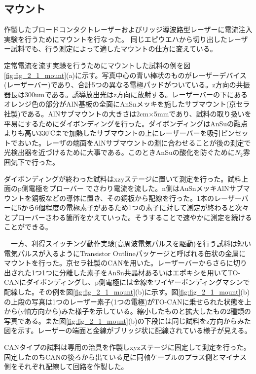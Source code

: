 \subsection{マウント}%
作製したブロードコンタクトレーザーおよびリッジ導波路型レーザーに電流注入実験を行うためにマウントを行なった。
同じエピウエハから切り出したレーザー試料でも、行う測定によって適したマウントの仕方に変えている。


定常電流を流す実験を行うためにマウントした試料の例を図\ref{fig:fig_2_1_mount}(a)に示す。写真中心の青い棒状のものがレーザーデバイス(レーザーバー)であり、合計5つの異なる電極パッドがついている。z方向の共振器長は300umである。誘導放出光はz方向に放射する。レーザーバーの下にあるオレンジ色の部分がAlN基板の全面にAnSnメッキを施したサブマウント(京セラ社製)である。AlNサブマウントの大きさは2cm×5mmであり、試料の取り扱いを平易にするためにダイボンディングを行った。ダイボンディングはAnSuの融点よりも高い330℃まで加熱したサブマウントの上にレーザーバーを吸引ピンセットでおいた。レーザの端面をAlNサブマウントの淵に合わせることが後の測定で光検出器を近づけるために大事である。このときAnSuの酸化を防ぐために$N_{2}$雰囲気下で行った。


ダイボンディングが終わった試料はxzyステージに置いて測定を行った。試料上面のp側電極をプローバー
でさわり電流を流した。n側はAuSnメッキAlNサブマウントを銅板などの導体に置き、その銅板から配線を行った。1本のレーザーバーに5から6個程度の電極素子があるため1つの素子に対して測定が終わると次々とプローバーさわる箇所をかえていった。そうすることで速やかに測定を続けることができる。


　一方、利得スイッチング動作実験(高周波電気パルスを駆動)を行う試料は短い電気パルスが入るようにTransistor Outlineパッケージと呼ばれる缶状の金属にマウントを行った。京セラ社製のCANを用いた。レーザーバーからさらに切り出された1つ1つに分離した素子をAnSn共晶材あるいはエポキシを用いてTO-CANにダイボンディングし、p側電極には金線をワイヤーボンディングマシンで配線した。その例を図\ref{fig:fig_2_1_mount}(b)に示す。図\ref{fig:fig_2_1_mount}(b)の上段の写真は1つのレーザー素子(1つの電極)がTO-CANに乗せられた状態を上から(y軸方向から)みた様子を示している。縮小したものと拡大したもの2種類の写真である。また図\ref{fig:fig_2_1_mount}(b)の下段には同じ試料をz方向からみた図を示す。レーザーの端面と金線がブリッジ状に配線されている様子が見える。

CANタイプの試料は専用の治具を作製しxyzステージに固定して測定を行った。固定したのちCANの後ろから出ている足に同軸ケーブルのプラス側とマイナス側をそれぞれ配線して回路を作製した。

